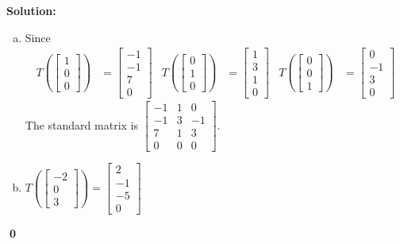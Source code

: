 \documentclass{article}
\newenvironment{solution}
{
  \ignorespaces
  \textbf{Solution:}
}
{
  \ignorespacesafterend
  \begin{flushright}
  {\bfseries \qed}
  \end{flushright}
}
\begin{document}
\begin{solution}
\begin{enumerate}[(a)]
\item Since
\begin{align*}
T\left(\begin{bmatrix} 1 \\ 0 \\ 0 \end{bmatrix}\right) &= \begin{bmatrix} -1 \\ -1 \\ 7 \\0\end{bmatrix} &
T\left(\begin{bmatrix} 0 \\ 1 \\ 0 \end{bmatrix}\right) &= \begin{bmatrix} 1 \\ 3 \\ 1 \\0 \end{bmatrix}  &
T\left(\begin{bmatrix} 0 \\ 0 \\ 1 \end{bmatrix}\right) &= \begin{bmatrix} 0 \\ -1 \\ 3 \\ 0  \end{bmatrix}
\end{align*}
The standard matrix is \( \begin{bmatrix} -1 & 1 & 0 \\ -1 & 3 & -1 \\ 7 & 1 & 3  \\ 0 & 0 & 0 \end{bmatrix} \).
\item \( T\left( \begin{bmatrix}-2 \\ 0 \\ 3 \end{bmatrix} \right)  = \begin{bmatrix} 2 \\ -1 \\ -5 \\ 0 \end{bmatrix}\)
\end{enumerate}
\end{solution}
\end{document}
